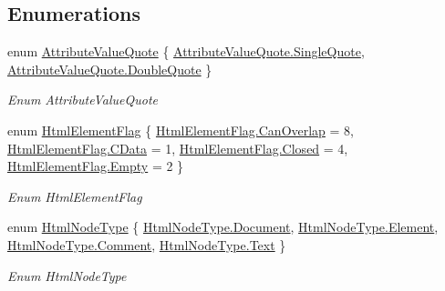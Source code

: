 \subsection*{Enumerations}
\begin{DoxyCompactItemize}
\item 
enum \hyperlink{namespace_html_agility_pack_a64d9f2b9c91f0f73e761936646ebcc57}{Attribute\+Value\+Quote} \{ \hyperlink{namespace_html_agility_pack_a64d9f2b9c91f0f73e761936646ebcc57aab6f946be65ae6c2ee9b1131872a4f19}{Attribute\+Value\+Quote.\+Single\+Quote}, 
\hyperlink{namespace_html_agility_pack_a64d9f2b9c91f0f73e761936646ebcc57a312f3eacb3208038b0963fd457c576e8}{Attribute\+Value\+Quote.\+Double\+Quote}
 \}\begin{DoxyCompactList}\small\item\em Enum Attribute\+Value\+Quote \end{DoxyCompactList}
\item 
enum \hyperlink{namespace_html_agility_pack_a4db40c4f5c900094c5a7fba47320a34a}{Html\+Element\+Flag} \{ \hyperlink{namespace_html_agility_pack_a4db40c4f5c900094c5a7fba47320a34aa54b5bebc95f25a1e5a160c6a63db67cf}{Html\+Element\+Flag.\+Can\+Overlap} = 8, 
\hyperlink{namespace_html_agility_pack_a4db40c4f5c900094c5a7fba47320a34aafd05767480ead2448fe29775ed214a0e}{Html\+Element\+Flag.\+C\+Data} = 1, 
\hyperlink{namespace_html_agility_pack_a4db40c4f5c900094c5a7fba47320a34aa03f4a47830f97377a35321051685071e}{Html\+Element\+Flag.\+Closed} = 4, 
\hyperlink{namespace_html_agility_pack_a4db40c4f5c900094c5a7fba47320a34aace2c8aed9c2fa0cfbed56cbda4d8bf07}{Html\+Element\+Flag.\+Empty} = 2
 \}\begin{DoxyCompactList}\small\item\em Enum Html\+Element\+Flag \end{DoxyCompactList}
\item 
enum \hyperlink{namespace_html_agility_pack_a0f81457339b5330e8cf9abe5a6123171}{Html\+Node\+Type} \{ \hyperlink{namespace_html_agility_pack_a0f81457339b5330e8cf9abe5a6123171a0945359809dad1fbf3dea1c95a0da951}{Html\+Node\+Type.\+Document}, 
\hyperlink{namespace_html_agility_pack_a0f81457339b5330e8cf9abe5a6123171a231afe47f3f37d3808096b36c28b4ded}{Html\+Node\+Type.\+Element}, 
\hyperlink{namespace_html_agility_pack_a0f81457339b5330e8cf9abe5a6123171a0be8406951cdfda82f00f79328cf4efc}{Html\+Node\+Type.\+Comment}, 
\hyperlink{namespace_html_agility_pack_a0f81457339b5330e8cf9abe5a6123171a9dffbf69ffba8bc38bc4e01abf4b1675}{Html\+Node\+Type.\+Text}
 \}\begin{DoxyCompactList}\small\item\em Enum Html\+Node\+Type \end{DoxyCompactList}

\end{DoxyCompactItemize}
